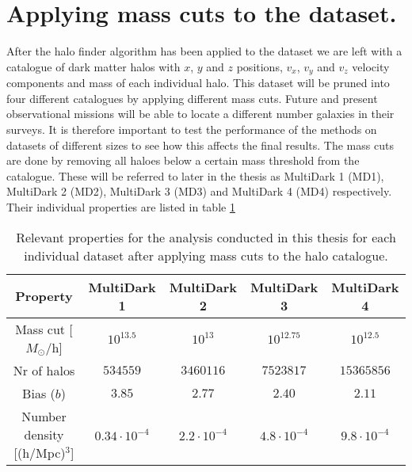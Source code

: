 \section{Applying mass cuts to the dataset.}
After the halo finder algorithm has been applied to the dataset we are left with a catalogue of dark matter halos with $x$, $y$ and $z$ positions, $v_x$, $v_y$ and $v_z$ velocity components and mass of each individual halo. This dataset will be pruned into four different catalogues by applying different mass cuts. Future and present observational missions will be able to locate a different number galaxies in their surveys. It is therefore important to test the performance of the methods on datasets of different sizes to see how this affects the final results. The mass cuts are done by removing all haloes below a certain mass threshold from the catalogue. These will be referred to later in the thesis as MultiDark 1 (MD1), MultiDark 2 (MD2), MultiDark 3 (MD3) and MultiDark 4 (MD4) respectively. Their individual properties are listed in table \ref{tab:MDproperties}
\begin{table}\label{tab:MDproperties}
    \begin{tabular}{| c | c | c | c | c | }
        \hline
        Property & MultiDark 1 & MultiDark 2 & MultiDark 3 & MultiDark 4 \\
        \hline
        Mass cut [$M_\odot$/h] & $10^{13.5}$ & $10^{13}$ & $10^{12.75}$ & $10^{12.5}$ \\ 
        Nr of halos &$534559$& $3460116$ & $7523817$& $15365856$ \\
        Bias ($b$) & $3.85$ & $2.77$ & $2.40$ & $2.11$ \\
        Number density [(h/Mpc)$^3$] & $0.34\cdot10^{-4}$ & $2.2\cdot10^{-4}$ & $4.8\cdot10^{-4}$ & $9.8\cdot10^{-4}$ \\
        \hline
    \end{tabular}
    \caption{Relevant properties for the analysis conducted in this thesis for each individual dataset after applying mass cuts to the halo catalogue.}
\end{table}

